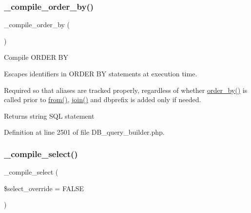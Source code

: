 \mbox{\label{class_c_i___d_b__query__builder_a78ef026e2ca49e2b371f9cc577f6e777}} 
\subsubsection{\texorpdfstring{\_compile\_order\_by()}{\_compile\_order\_by()}}
{\footnotesize\ttfamily \+\_\+compile\+\_\+order\+\_\+by (\begin{DoxyParamCaption}{ }\end{DoxyParamCaption})\hspace{0.3cm}{\ttfamily [protected]}}

Compile O\+R\+D\+ER BY

Escapes identifiers in O\+R\+D\+ER BY statements at execution time.

Required so that aliases are tracked properly, regardless of whether \mbox{\hyperlink{class_c_i___d_b__query__builder_a6d1ce6a3b22187165ce7d710ce91841d}{order\+\_\+by()}} is called prior to \mbox{\hyperlink{class_c_i___d_b__query__builder_a91f5f004ed8e2237a4decc5d23ac3457}{from()}}, \mbox{\hyperlink{class_c_i___d_b__query__builder_a54557b1ef757507cbbd2a8802a99810b}{join()}} and dbprefix is added only if needed.

\begin{DoxyReturn}{Returns}
string S\+QL statement 
\end{DoxyReturn}


Definition at line 2501 of file D\+B\+\_\+query\+\_\+builder.\+php.

\mbox{\label{class_c_i___d_b__query__builder_a441f6e994a212cfa12dd33d92973915b}} 
\subsubsection{\texorpdfstring{\_compile\_select()}{\_compile\_select()}}
{\footnotesize\ttfamily \+\_\+compile\+\_\+select (\begin{DoxyParamCaption}\item[{}]{\$select\+\_\+override = {\ttfamily FALSE} }\end{DoxyParamCaption})\hspace{0.3cm}{\ttfamily [protected]}}


